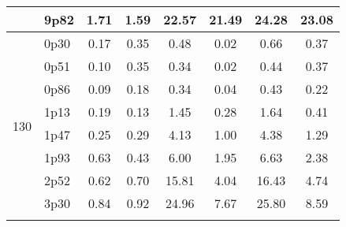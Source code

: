 \documentclass[12pt,A4paper]{article}
\begin{document}
\begin{table}[]
\begin{tabular}{llllllll}
\multicolumn{1}{|l|}{} & \multicolumn{1}{l|}{9p82} & \multicolumn{1}{c|}{1.71}        & \multicolumn{1}{c|}{1.59}         & \multicolumn{1}{c|}{22.57}        & \multicolumn{1}{c|}{21.49}         & \multicolumn{1}{c|}{24.28}        & \multicolumn{1}{c|}{23.08}         \\ \hline
\multicolumn{1}{|l|}{\multirow{11}{*}{130}} & \multicolumn{1}{l|}{0p30} & \multicolumn{1}{c|}{0.17}        & \multicolumn{1}{c|}{0.35}         & \multicolumn{1}{c|}{0.48}        & \multicolumn{1}{c|}{0.02}         & \multicolumn{1}{c|}{0.66}        & \multicolumn{1}{c|}{0.37}         \\ \cline{2-8} 
\multicolumn{1}{|l|}{} & \multicolumn{1}{l|}{0p51} & \multicolumn{1}{c|}{0.10}        & \multicolumn{1}{c|}{0.35}         & \multicolumn{1}{c|}{0.34}        & \multicolumn{1}{c|}{0.02}         & \multicolumn{1}{c|}{0.44}        & \multicolumn{1}{c|}{0.37}         \\ \cline{2-8}
\multicolumn{1}{|l|}{} & \multicolumn{1}{l|}{0p86} & \multicolumn{1}{c|}{0.09}        & \multicolumn{1}{c|}{0.18}         & \multicolumn{1}{c|}{0.34}        & \multicolumn{1}{c|}{0.04}         & \multicolumn{1}{c|}{0.43}        & \multicolumn{1}{c|}{0.22}         \\ \cline{2-8}
\multicolumn{1}{|l|}{} & \multicolumn{1}{l|}{1p13} & \multicolumn{1}{c|}{0.19}        & \multicolumn{1}{c|}{0.13}         & \multicolumn{1}{c|}{1.45}        & \multicolumn{1}{c|}{0.28}         & \multicolumn{1}{c|}{1.64}        & \multicolumn{1}{c|}{0.41}         \\ \cline{2-8}
\multicolumn{1}{|l|}{} & \multicolumn{1}{l|}{1p47} & \multicolumn{1}{c|}{0.25}        & \multicolumn{1}{c|}{0.29}         & \multicolumn{1}{c|}{4.13}        & \multicolumn{1}{c|}{1.00}         & \multicolumn{1}{c|}{4.38}        & \multicolumn{1}{c|}{1.29}         \\ \cline{2-8}
\multicolumn{1}{|l|}{} & \multicolumn{1}{l|}{1p93} & \multicolumn{1}{c|}{0.63}        & \multicolumn{1}{c|}{0.43}         & \multicolumn{1}{c|}{6.00}        & \multicolumn{1}{c|}{1.95}         & \multicolumn{1}{c|}{6.63}        & \multicolumn{1}{c|}{2.38}         \\ \cline{2-8}
\multicolumn{1}{|l|}{} & \multicolumn{1}{l|}{2p52} & \multicolumn{1}{c|}{0.62}        & \multicolumn{1}{c|}{0.70}         & \multicolumn{1}{c|}{15.81}        & \multicolumn{1}{c|}{4.04}         & \multicolumn{1}{c|}{16.43}        & \multicolumn{1}{c|}{4.74}         \\ \cline{2-8}
\multicolumn{1}{|l|}{} & \multicolumn{1}{l|}{3p30} & \multicolumn{1}{c|}{0.84}        & \multicolumn{1}{c|}{0.92}         & \multicolumn{1}{c|}{24.96}        & \multicolumn{1}{c|}{7.67}         & \multicolumn{1}{c|}{25.80}        & \multicolumn{1}{c|}{8.59}         \\ \cline{2-8}

\end{tabular}
\end{table}
\end{document}
